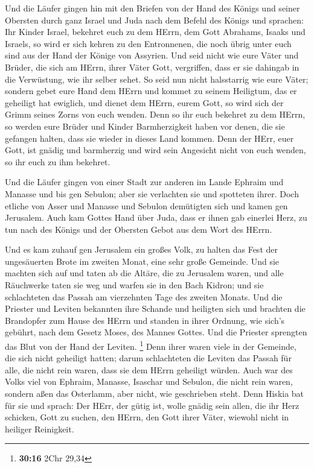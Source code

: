  Und die Läufer gingen hin mit den Briefen von der Hand des
Königs und seiner Obersten durch ganz Israel und Juda nach dem Befehl
des Königs und sprachen: Ihr Kinder Israel, bekehret euch zu dem HErrn,
dem Gott Abrahams, Isaaks und Israels, so wird er sich kehren zu den
Entronnenen, die noch übrig unter euch sind aus der Hand der Könige von
Assyrien.  Und seid nicht wie eure Väter und Brüder, die
sich am HErrn, ihrer Väter Gott, vergriffen, dass er sie dahingab in die
Verwüstung, wie ihr selber sehet.  So seid nun nicht
halsstarrig wie eure Väter; sondern gebet eure Hand dem HErrn und kommet
zu seinem Heiligtum, das er geheiligt hat ewiglich, und dienet dem
HErrn, eurem Gott, so wird sich der Grimm seines Zorns von euch wenden.
 Denn so ihr euch bekehret zu dem HErrn, so werden eure
Brüder und Kinder Barmherzigkeit haben vor denen, die sie gefangen
halten, dass sie wieder in dieses Land kommen. Denn der HErr, euer Gott,
ist gnädig und barmherzig und wird sein Angesicht nicht von euch wenden,
so ihr euch zu ihm bekehret.

 Und die Läufer gingen von einer Stadt zur anderen im Lande
Ephraim und Manasse und bis gen Sebulon; aber sie verlachten sie und
spotteten ihrer.  Doch etliche von Asser und Manasse und
Sebulon demütigten sich und kamen gen Jerusalem.  Auch kam
Gottes Hand über Juda, dass er ihnen gab einerlei Herz, zu tun nach des
Königs und der Obersten Gebot aus dem Wort des HErrn.

 Und es kam zuhauf gen Jerusalem ein großes Volk, zu halten
das Fest der ungesäuerten Brote im zweiten Monat, eine sehr große
Gemeinde.  Und sie machten sich auf und taten ab die
Altäre, die zu Jerusalem waren, und alle Räuchwerke taten sie weg und
warfen sie in den Bach Kidron;  und sie schlachteten das
Passah am vierzehnten Tage des zweiten Monats. Und die Priester und
Leviten bekannten ihre Schande und heiligten sich und brachten die
Brandopfer zum Hause des HErrn  und standen in ihrer
Ordnung, wie sich's gebührt, nach dem Gesetz Moses, des Mannes Gottes.
Und die Priester sprengten das Blut von der Hand der Leviten.
\footnote{\textbf{30:16} 2Chr 29,34}  Denn ihrer waren
viele in der Gemeinde, die sich nicht geheiligt hatten; darum
schlachteten die Leviten das Passah für alle, die nicht rein waren, dass
sie dem HErrn geheiligt würden.  Auch war des Volks viel
von Ephraim, Manasse, Isaschar und Sebulon, die nicht rein waren,
sondern aßen das Osterlamm, aber nicht, wie geschrieben steht. Denn
Hiskia bat für sie und sprach: Der HErr, der gütig ist, wolle gnädig
sein  allen, die ihr Herz schicken, Gott zu suchen, den
HErrn, den Gott ihrer Väter, wiewohl nicht in heiliger Reinigkeit.

